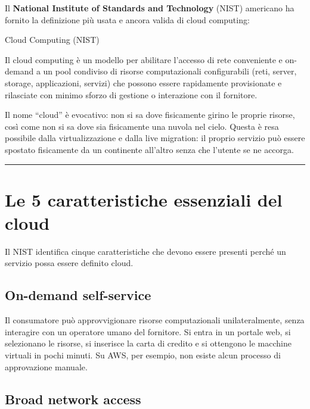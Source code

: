 \documentclass[
  italian,
  openany]{book}
\begin{document}
Il \textbf{National Institute of Standards and Technology} (NIST)
americano ha fornito la definizione più usata e ancora valida di cloud
computing:

\begin{calloutdefinition}{Cloud Computing (NIST)}

Il cloud computing è un modello per abilitare l'accesso di rete
conveniente e on-demand a un pool condiviso di risorse computazionali
configurabili (reti, server, storage, applicazioni, servizi) che possono
essere rapidamente provisionate e rilasciate con minimo sforzo di
gestione o interazione con il fornitore.

\end{calloutdefinition}

Il nome ``cloud'' è evocativo: non si sa dove fisicamente girino le
proprie risorse, così come non si sa dove sia fisicamente una nuvola nel
cielo. Questa è resa possibile dalla virtualizzazione e dalla live
migration: il proprio servizio può essere spostato fisicamente da un
continente all'altro senza che l'utente se ne accorga.

\begin{center}\rule{0.5\linewidth}{0.5pt}\end{center}

\section{Le 5 caratteristiche essenziali del
cloud}\label{le-5-caratteristiche-essenziali-del-cloud}

Il NIST identifica cinque caratteristiche che devono essere presenti
perché un servizio possa essere definito cloud.

\subsection{On-demand self-service}\label{on-demand-self-service}

Il consumatore può approvvigionare risorse computazionali
unilateralmente, senza interagire con un operatore umano del fornitore.
Si entra in un portale web, si selezionano le risorse, si inserisce la
carta di credito e si ottengono le macchine virtuali in pochi minuti. Su
AWS, per esempio, non esiste alcun processo di approvazione manuale.

\subsection{Broad network access}\label{broad-network-access}
\end{document}

